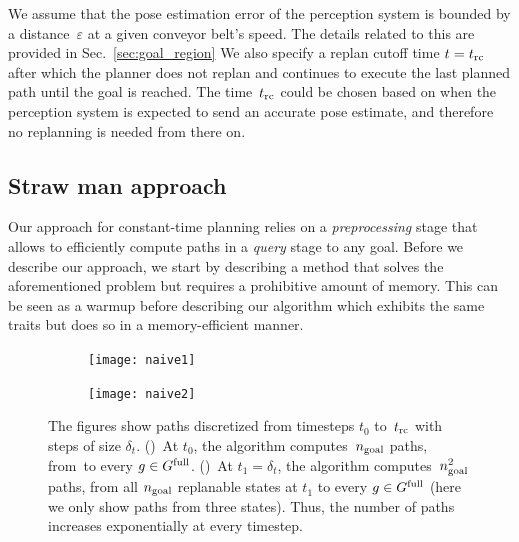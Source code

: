 \documentclass[a4paper]{report}
\begin{document}
{%
}
We assume that the pose estimation error of the perception system is bounded by a distance~$\varepsilon$ at a given conveyor belt's speed. The details related to this are provided in Sec.~\ref{sec:goal_region}
We also specify a replan cutoff time $t=t_{\textrm{rc}}$ after which the planner does not replan and continues to execute the last planned path until the goal is reached. The time~$t_{\textrm{rc}}$ could be chosen based on when the perception system is expected to send an accurate pose estimate, and therefore no replanning is needed from there on.


\subsection{Straw man approach}
\label{subsec:strawman}
Our approach for constant-time planning relies on a \emph{preprocessing} stage that allows to efficiently compute paths in a \emph{query} stage to any goal.
%
Before we describe our approach, we start by describing a \naive method that solves the aforementioned problem but requires a prohibitive amount of memory.
%
This can be seen as a warmup before describing our algorithm which exhibits the same traits but does so in a memory-efficient manner.

\begin{figure}[t]
    \centering
    \begin{subfigure}{.49\textwidth}
        \texttt{[image: naive1]}
        \caption{}
        \label{fig:naive1}
    \end{subfigure}
    \begin{subfigure}{0.49\textwidth}
        \texttt{[image: naive2]}
        \caption{}
        \label{fig:naive2}
    \end{subfigure}
    \caption{
    \CaptionTextSize
    The figures show paths discretized from timesteps $t_0$ to~$t_{\textrm{rc}}$ with steps of size $\delta_t$.
    ()~At $t_0$, the algorithm computes~$n_{\rm goal}$ paths, from~\Shome to every $g \in G^{\textrm{full}}$.
    ()~At $t_1 = \delta_t$, the algorithm computes~$n_{\rm goal}^2$ paths, from all $n_{\rm goal}$ replanable states at $t_1$ to every $g \in G^{\textrm{full}}$ (here we only show paths from three states).
    Thus, the number of paths increases exponentially at every timestep.
    }
    \label{fig:naive}
\end{figure}
\end{document}
